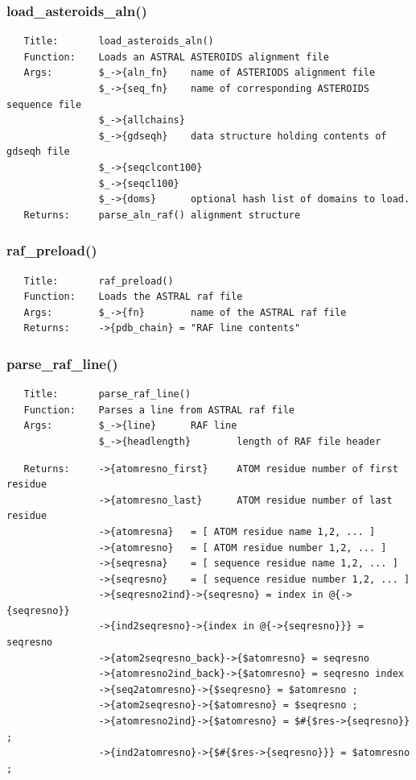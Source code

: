 \documentclass{article}
\begin{document}
\subsubsection*{load\_asteroids\_aln()\label{pibase::ASTRAL_load_asteroids_aln_}}
\begin{verbatim}
   Title:       load_asteroids_aln()
   Function:    Loads an ASTRAL ASTEROIDS alignment file
   Args:        $_->{aln_fn}    name of ASTERIODS alignment file
                $_->{seq_fn}    name of corresponding ASTEROIDS sequence file
                $_->{allchains} 
                $_->{gdseqh}    data structure holding contents of gdseqh file
                $_->{seqclcont100}
                $_->{seqcl100}
                $_->{doms}      optional hash list of domains to load.
   Returns:     parse_aln_raf() alignment structure
\end{verbatim}
\subsubsection*{raf\_preload()\label{pibase::ASTRAL_raf_preload_}}
\begin{verbatim}
   Title:       raf_preload()
   Function:    Loads the ASTRAL raf file
   Args:        $_->{fn}        name of the ASTRAL raf file
   Returns:     ->{pdb_chain} = "RAF line contents"
\end{verbatim}
\subsubsection*{parse\_raf\_line()\label{pibase::ASTRAL_parse_raf_line_}}
\begin{verbatim}
   Title:       parse_raf_line()
   Function:    Parses a line from ASTRAL raf file
   Args:        $_->{line}      RAF line
                $_->{headlength}        length of RAF file header
\end{verbatim}
\begin{verbatim}
   Returns:     ->{atomresno_first}     ATOM residue number of first residue
                ->{atomresno_last}      ATOM residue number of last residue
                ->{atomresna}   = [ ATOM residue name 1,2, ... ]
                ->{atomresno}   = [ ATOM residue number 1,2, ... ]
                ->{seqresna}    = [ sequence residue name 1,2, ... ]
                ->{seqresno}    = [ sequence residue number 1,2, ... ]
                ->{seqresno2ind}->{seqresno} = index in @{->{seqresno}}
                ->{ind2seqresno}->{index in @{->{seqresno}}} = seqresno
                ->{atom2seqresno_back}->{$atomresno} = seqresno
                ->{atomresno2ind_back}->{$atomresno} = seqresno index
                ->{seq2atomresno}->{$seqresno} = $atomresno ;
                ->{atom2seqresno}->{$atomresno} = $seqresno ;
                ->{atomresno2ind}->{$atomresno} = $#{$res->{seqresno}} ;
                ->{ind2atomresno}->{$#{$res->{seqresno}}} = $atomresno  ;
\end{verbatim}
\end{document}
